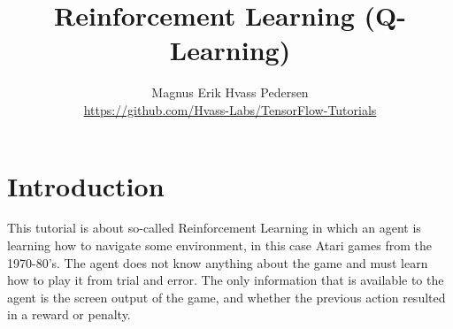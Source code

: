 \documentclass{article}
\title{Reinforcement Learning (Q-Learning)}
\author{Magnus Erik Hvass Pedersen\\ \url{https://github.com/Hvass-Labs/TensorFlow-Tutorials}}
\begin{document}
\maketitle
\section{Introduction}
This tutorial is about so-called Reinforcement Learning in which an agent is learning how to navigate some environment, in this case Atari games from the 1970-80's. The agent does not know anything about the game and must learn how to play it from trial and error. The only information that is available to the agent is the screen output of the game, and whether the previous action resulted in a reward or penalty.

%
%
%
%
%
\end{document}

